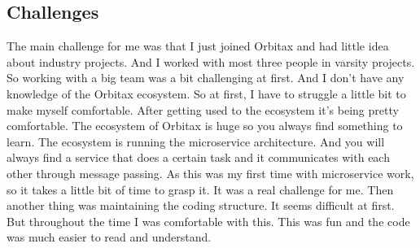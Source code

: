 \begin{flushleft}
\subsection{Challenges}
The main challenge for me was that I just joined Orbitax and had little idea about industry projects. And I worked with most three people in varsity projects. So working with a big team was a bit challenging at first.  And I don’t have any knowledge of the Orbitax ecosystem. So at first, I have to struggle a little bit to make myself comfortable. After getting used to the ecosystem it’s being pretty comfortable.
The ecosystem of Orbitax is huge so you always find something to learn. The ecosystem is running the microservice architecture. And you will always find a service that does a certain task and it communicates with each other through message passing. As this was my first time with microservice work, so it takes a little bit of time to grasp it. It was a real challenge for me.
Then another thing was maintaining the coding structure. It seems difficult at first. But throughout the time I was comfortable with this. This was fun and the code was much easier to read and understand.
\end{flushleft}